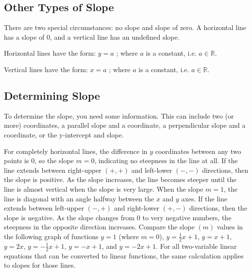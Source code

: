 \subsection{Other Types of Slope}
\label{sss:othe-c807}

There are two special circumstances: no slope and slope of zero. A horizontal line has a
slope of 0, and a vertical line has an undefined slope.

Horizontal lines have the form: $y = a$ ; where $a$ is a constant, i.e. $a \in \mathbb{R}$.

Vertical lines have the form: $x = a$ ; where $a$ is a constant, i.e. $a \in \mathbb{R}$.

\subsection{Determining Slope}
\label{sss:dete-8960}

To determine the slope, you need some information. This can include two (or more)
coordinates, a parallel slope and a coordinate, a perpendicular slope and a coordinate, or
the y-intercept and slope.

For completely horizontal lines, the difference in $y$ coordinates between any two points is 0, so the slope $m = 0$, indicating no steepness in the line at all. If the line extends between right-upper $(+,+)$ and left-lower $(-,-)$ directions, then the slope is positive. As the slope increases, the line becomes steeper until the line is almost vertical when the slope is very large. When the slope $m = 1$, the line is diagonal with an angle halfway between the $x$ and $y$ axes. If the line extends between left-upper $(-,+)$ and right-lower $(+,-)$ directions, then the slope is negative. As the slope changes from 0 to very negative numbers, the steepness in the opposite direction increases. Compare the slope $(m)$ values in the following graph of functions $y = 1$ (where $m = 0$), $y = \frac{1}{2}x + 1$, $y = x + 1$, $y = 2x$, $y = -\frac{1}{2}x + 1$, $y = -x + 1$, and $y = -2x + 1$. For all two-variable linear equations that can be converted to linear functions, the same calculation applies to slopes for those lines.

